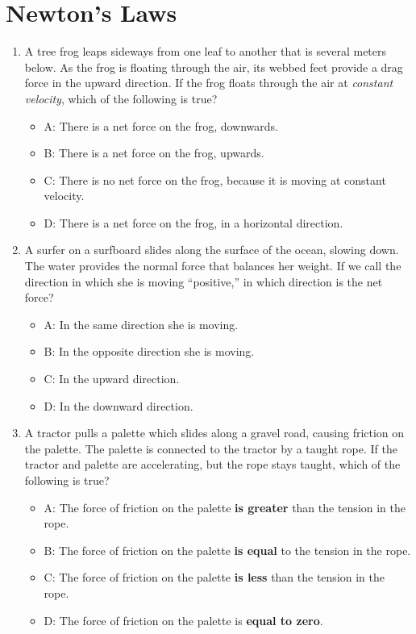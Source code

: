 \documentclass[10pt]{article}
\begin{document}
\section{Newton's Laws}
\begin{enumerate}
\small
\item A tree frog leaps sideways from one leaf to another that is several meters below.  As the frog is floating through the air, its webbed feet provide a drag force in the upward direction.  If the frog floats through the air at \textit{constant velocity}, which of the following is true?
\begin{itemize}
\item A: There is a net force on the frog, downwards.
\item B: There is a net force on the frog, upwards.
\item C: There is no net force on the frog, because it is moving at constant velocity.
\item D: There is a net force on the frog, in a horizontal direction.
\end{itemize}
\item A surfer on a surfboard slides along the surface of the ocean, slowing down.  The water provides the normal force that balances her weight.  If we call the direction in which she is moving ``positive,'' in which direction is the net force?
\begin{itemize}
\item A: In the same direction she is moving.
\item B: In the opposite direction she is moving.
\item C: In the upward direction.
\item D: In the downward direction.
\end{itemize}
\item A tractor pulls a palette which slides along a gravel road, causing friction on the palette.  The palette is connected to the tractor by a taught rope.  If the tractor and palette are accelerating, but the rope stays taught, which of the following is true?
\begin{itemize}
\item A: The force of friction on the palette \textbf{is greater} than the tension in the rope.
\item B: The force of friction on the palette \textbf{is equal} to the tension in the rope.
\item C: The force of friction on the palette \textbf{is less} than the tension in the rope.
\item D: The force of friction on the palette is \textbf{equal to zero}.

\end{itemize}
\end{enumerate}
\end{document}
